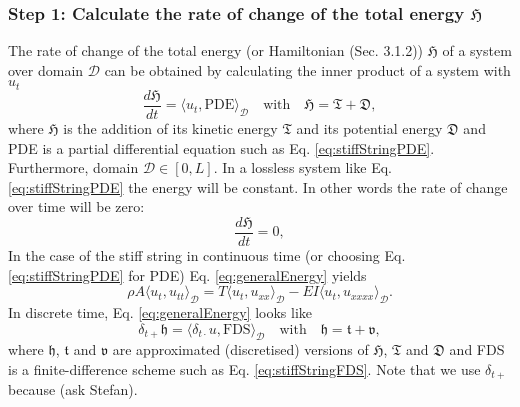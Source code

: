 \documentclass{article}
\begin{document}
\subsubsection*{Step 1: Calculate the rate of change of the total energy $\mathfrak{H}$} %
The rate of change of the total energy (or Hamiltonian (Sec. 3.1.2)) $\mathfrak{H}$ of a system over domain $\mathcal{D}$ can be obtained by calculating the inner product of a system with $u_t$ \cite{Desv2017}
\begin{equation}\label{eq:generalEnergy}
    \frac{d \mathfrak{H}}{dt} = \langle u_t, \text{PDE} \rangle_\mathcal{D} \quad \text{with} \quad \mathfrak{H} = \mathfrak{T} + \mathfrak{D},
\end{equation}
where $\mathfrak{H}$ is the addition of its kinetic energy $\mathfrak{T}$ and its potential energy $\mathfrak{D}$ and PDE is a partial differential equation such as Eq. \eqref{eq:stiffStringPDE}. Furthermore, domain $\mathcal{D} \in [0,L]$. In a lossless system like Eq. \eqref{eq:stiffStringPDE} the energy will be constant. In other words the rate of change over time will be zero:
\begin{equation}\label{eq:energyZero}
    \frac{d \mathfrak{H}}{dt} = 0,
\end{equation}
In the case of the stiff string in continuous time (or choosing Eq. \eqref{eq:stiffStringPDE} for PDE) Eq. \eqref{eq:generalEnergy} yields
\begin{equation}\label{eq:stiffStringInnerProduct}
     \rho A \langle u_t, u_{tt}\rangle_\mathcal{D} = T \langle u_t, u_{xx}\rangle_\mathcal{D} - EI \langle u_t, u_{xxxx} \rangle_\mathcal{D}.
\end{equation}
In discrete time, Eq. \eqref{eq:generalEnergy} looks like %
\begin{equation}\label{eq:generalEnergyDiscretised}
    \delta_{t+}\mathfrak{h} = \langle \delta_{t\cdot}u, \text{FDS}\rangle_\mathcal{D} \quad \text{with} \quad \mathfrak{h} = \mathfrak{t} + \mathfrak{v},
\end{equation}
where $\mathfrak{h}$, $\mathfrak{t}$ and $\mathfrak{v}$ are approximated (discretised) versions of $\mathfrak{H}$, $\mathfrak{T}$ and $\mathfrak{D}$ and FDS is a finite-difference scheme such as Eq. \eqref{eq:stiffStringFDS}. Note that we use $\delta_{t+}$ because (ask Stefan).
\end{document}
